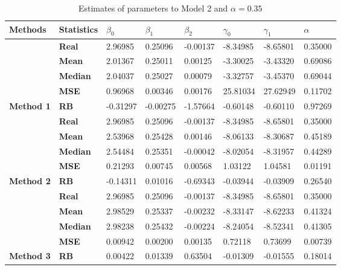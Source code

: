 \begin{table}

\caption{\label{tab:Est_model_2_Alpha0.35}Estimates of parameters to Model 2 and $\alpha=0.35$}
\centering
\begin{tabular}[t]{>{}l>{}lllllll}
\toprule
Methods & Statistics & $\beta_0$ & $\beta_1$ & $\beta_2$ & $\gamma_0$ & $\gamma_1$ & $\alpha$\\
\midrule
 & \textbf{Real} & 2.96985 & 0.25096 & -0.00137 & -8.34985 & -8.65801 & 0.35000\\
\cmidrule{2-8}
 & \textbf{Mean} & 2.01367 & 0.25011 & 0.00125 & -3.30025 & -3.43320 & 0.69086\\
\cmidrule{2-8}
 & \textbf{Median} & 2.04037 & 0.25027 & 0.00079 & -3.32757 & -3.45370 & 0.69044\\
\cmidrule{2-8}
 & \textbf{MSE} & 0.96968 & 0.00346 & 0.00176 & 25.81034 & 27.62949 & 0.11702\\
\cmidrule{2-8}
\multirow{-5}{*}{\raggedright\arraybackslash \textbf{Method 1}} & \textbf{RB} & -0.31297 & -0.00275 & -1.57664 & -0.60148 & -0.60110 & 0.97269\\
\cmidrule{1-8}
 & \textbf{Real} & 2.96985 & 0.25096 & -0.00137 & -8.34985 & -8.65801 & 0.35000\\
\cmidrule{2-8}
 & \textbf{Mean} & 2.53968 & 0.25428 & 0.00146 & -8.06133 & -8.30687 & 0.45189\\
\cmidrule{2-8}
 & \textbf{Median} & 2.54484 & 0.25351 & -0.00042 & -8.02054 & -8.31957 & 0.44289\\
\cmidrule{2-8}
 & \textbf{MSE} & 0.21293 & 0.00745 & 0.00568 & 1.03122 & 1.04581 & 0.01191\\
\cmidrule{2-8}
\multirow{-5}{*}{\raggedright\arraybackslash \textbf{Method 2}} & \textbf{RB} & -0.14311 & 0.01016 & -0.69343 & -0.03944 & -0.03909 & 0.26540\\
\cmidrule{1-8}
 & \textbf{Real} & 2.96985 & 0.25096 & -0.00137 & -8.34985 & -8.65801 & 0.35000\\
\cmidrule{2-8}
 & \textbf{Mean} & 2.98529 & 0.25337 & -0.00232 & -8.33147 & -8.62233 & 0.41324\\
\cmidrule{2-8}
 & \textbf{Median} & 2.98238 & 0.25432 & -0.00224 & -8.24054 & -8.52341 & 0.41305\\
\cmidrule{2-8}
 & \textbf{MSE} & 0.00942 & 0.00200 & 0.00135 & 0.72118 & 0.73699 & 0.00739\\
\cmidrule{2-8}
\multirow{-5}{*}{\raggedright\arraybackslash \textbf{Method 3}} & \textbf{RB} & 0.00422 & 0.01339 & 0.63504 & -0.01309 & -0.01555 & 0.18014\\
\bottomrule
\end{tabular}
\end{table}
